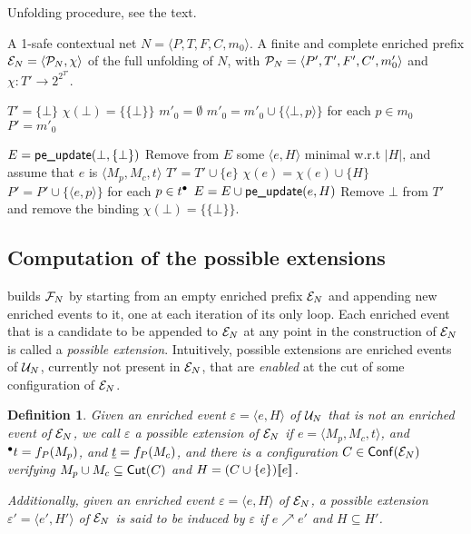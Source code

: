 \documentclass[11pt,a4paper]{article}
\newtheorem{definition}[theorem]{Definition}
\newcommand{\conf}[1]{\ensuremath{\mathsf{Conf}(#1)}}
\newcommand{\peupdate}{\mbox{\sf pe\_update}}
\newcommand{\iscutoff}{\mbox{\sf is\_cutoff}}
\begin{document}
\begin{algorithm}
\caption{Unfolding procedure, see the text.}
\label{alg:unfolding.procedure}

\begin{algorithmic}
\REQUIRE A 1-safe contextual net $N = \langle P, T, F, C, m_0 \rangle$.
\ENSURE A finite and complete enriched prefix $\mathcal{E}_{N} = \langle \mathcal{P}_{N}, \chi
\rangle$ of the full unfolding of $N$, with $\mathcal{P}_{N} = \langle P', T', F', C',
m'_0 \rangle$ and $\chi : T' \to 2^{2^{T'}}$.

\vspace{1ex}
\STATE $T' = \{\bot\}$
\STATE $\chi (\bot) = \{\{\bot\}\}$
\STATE $m'_0 = \emptyset$
\STATE $m'_0 = m'_0 \cup \{\langle \bot, p \rangle\}$ for each $p \in m_0$
\STATE $P' = m'_0$

\STATE $E = \peupdate (\bot, \{\bot\})$
\STATE Remove from $E$ some $\langle e, H \rangle$ minimal w.r.t $|H|$, and
assume that $e$ is $\langle M_p, M_c, t \rangle$
\IF{not $\iscutoff (e, H)$}
\STATE $T' = T' \cup \{e\}$
\STATE $\chi(e) = \chi(e) \cup \{H\}$
\STATE $P' = P' \cup \{\langle e, p \rangle\}$ for each $p \in t^\bullet$
\STATE $E = E \cup \peupdate (e, H)$
\ENDIF
\ENDWHILE
\STATE Remove $\bot$ from $T'$ and remove the binding $\chi (\bot) =
\{\{\bot\}\}$.
\end{algorithmic}
\end{algorithm}

\subsection{Computation of the possible extensions}
\label{sec:computation.possible}

 builds $\mathcal{F}_{N}$ by starting from an empty enriched
prefix $\mathcal{E}_{N}$ and appending new enriched events to it, one at each iteration
of its only loop.  Each enriched event that is a candidate to be appended to
$\mathcal{E}_{N}$ at any point in the construction of $\mathcal{E}_{N}$ is called a
\emph{possible extension}.  Intuitively, possible extensions are enriched
events of $\mathcal{U}_{N}$, currently not present in $\mathcal{E}_{N}$, that are \emph{enabled}
at the cut of some configuration of $\mathcal{E}_{N}$.


\begin{definition}
\label{def:possible.extension}
Given an enriched event $\varepsilon = \langle e, H \rangle$ of $\mathcal{U}_{N}$ that
is not an enriched event of $\mathcal{E}_{N}$, we call $\varepsilon$ a \emph{possible
extension} of $\mathcal{E}_{N}$ if $e = \langle M_p, M_c, t \rangle$, and ${}^\bullet t = f_P
(M_p)$, and $\underline{t} = f_P (M_c)$, and there is a configuration $C \in
\conf{\enr N}$ verifying $M_p \cup M_c \subseteq \mathsf{Cut }{(C)}$ and $H = (C \cup
\{e\}) [\![ e]\!]$.

Additionally, given an enriched event $\varepsilon = \langle e, H \rangle$ of
$\mathcal{E}_{N}$, a possible extension $\varepsilon' = \langle e', H' \rangle$ of $\mathcal{E}_{N}$ is said to be \emph{induced by} $\varepsilon$ if $e \nearrow e'$ and $H
\subseteq H'$.
\end{definition}
\end{document}

